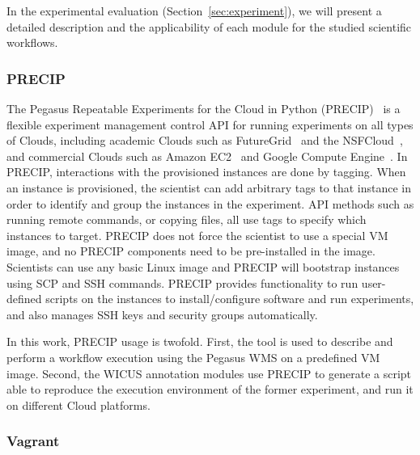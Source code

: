 In the experimental evaluation (Section~\ref{sec:experiment}), we will present a detailed description 
and the applicability of each module for the studied scientific workflows.



\subsubsection{PRECIP}
The Pegasus Repeatable Experiments for the Cloud in Python (PRECIP)~\cite{Azarnoosh-CRC-2013} 
is a flexible experiment management control API for running experiments on all types of Clouds, 
including academic Clouds such as FutureGrid~\cite{futuregrid} and the NSFCloud~\cite{chameleon,cloudlab}, 
and commercial Clouds such as Amazon EC2~\cite{aws} and Google Compute Engine~\cite{gce}. 
In PRECIP, interactions with the provisioned instances are done by tagging. When an instance is 
provisioned, the scientist can add arbitrary tags to that instance in order to identify and group the 
instances in the experiment. API methods such as running remote commands, or copying files, all 
use tags to specify which instances to target. PRECIP does not force the scientist to use a special 
VM image, and no PRECIP components need to be pre-installed in the image. Scientists can use 
any basic Linux image and PRECIP will bootstrap instances using SCP and SSH commands. 
PRECIP provides functionality to run user-defined scripts on the instances to install/configure 
software and run experiments, and also manages SSH keys and security groups automatically.

In this work, PRECIP usage is twofold. First, the tool is used to describe and perform a workflow 
execution using the Pegasus WMS on a predefined VM image. Second, the WICUS annotation 
modules use PRECIP to generate a script able to reproduce the execution environment of the 
former experiment, and run it on different Cloud platforms.


\subsubsection{Vagrant}


